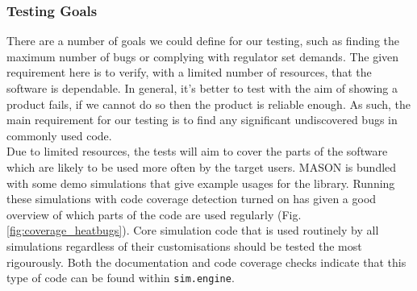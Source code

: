 \documentclass[11pt]{article}
\begin{document}




\subsubsection{Testing Goals}

There are a number of goals we could define for our testing, such as finding the maximum number of bugs or complying with regulator set demands.
The given requirement here is to verify, with a limited number of resources, that the software is dependable.
In general, it's better to test with the aim of showing a product fails, if we cannot do so then the product is reliable enough\cite[pp. 20]{lessons_book}.
As such, the main requirement for our testing is to find any significant undiscovered bugs in commonly used code.
\\

Due to limited resources, the tests will aim to cover the parts of the software which are likely to be used more often by the target users.
MASON is bundled with some demo simulations that give example usages for the library.
Running these simulations with code coverage detection turned on has given a good overview of which parts of the code are used regularly (Fig. \ref{fig:coverage_heatbugs}).
Core simulation code that is used routinely by all simulations regardless of their customisations should be tested the most rigourously.
Both the documentation and code coverage checks indicate that this type of code can be found within \texttt{sim.engine}.
\end{document}
